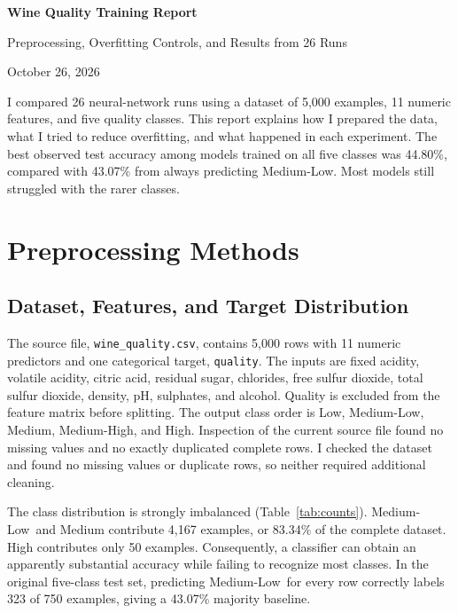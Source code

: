 \documentclass[11pt,letterpaper]{article}
\newcommand{\ML}{Medium-Low}
\newcommand{\MH}{Medium-High}
\begin{document}
\pagestyle{plain}
{\LARGE\bfseries Wine Quality Training Report\par}
\vspace{3pt}
{\large Preprocessing, Overfitting Controls, and Results from 26 Runs\par}
October 26, 2026
\vspace{6pt}

I compared 26 neural-network runs using a dataset of 5,000 examples, 11 numeric features, and five quality classes. This report explains how I prepared the data, what I tried to reduce overfitting, and what happened in each experiment. The best observed test accuracy among models trained on all five classes was 44.80\%, compared with 43.07\% from always predicting Medium-Low. Most models still struggled with the rarer classes.

\section{Preprocessing Methods}
\subsection{Dataset, Features, and Target Distribution}
The source file, \texttt{wine\_quality.csv}, contains 5,000 rows with 11 numeric predictors and one categorical target, \texttt{quality}. The inputs are fixed acidity, volatile acidity, citric acid, residual sugar, chlorides, free sulfur dioxide, total sulfur dioxide, density, pH, sulphates, and alcohol. Quality is excluded from the feature matrix before splitting. The output class order is Low, \ML, Medium, \MH, and High. Inspection of the current source file found no missing values and no exactly duplicated complete rows. I checked the dataset and found no missing values or duplicate rows, so neither required additional cleaning.

The class distribution is strongly imbalanced (Table~\ref{tab:counts}). \ML\ and Medium contribute 4,167 examples, or 83.34\% of the complete dataset. High contributes only 50 examples. Consequently, a classifier can obtain an apparently substantial accuracy while failing to recognize most classes. In the original five-class test set, predicting \ML\ for every row correctly labels 323 of 750 examples, giving a 43.07\% majority baseline.
\end{document}
